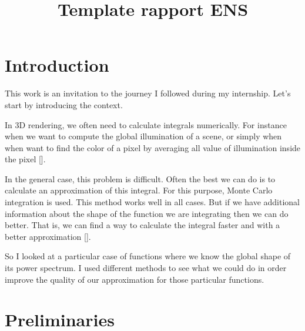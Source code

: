 \documentclass{classeENS}
\title{Template rapport ENS} %
\begin{document}

\matiere{} 
\motif{}


        
\fairemarges %
\tabledematieres %


\section{Introduction}

\> This work is an invitation to the journey I followed during my internship. 
Let's start by introducing the context.

\> In 3D rendering, we often need to calculate integrals numerically. 
For instance when we want to compute the global illumination of a scene,
or simply when when want to find the color of a pixel by averaging all
value of illumination inside the pixel [\cite{DBLP:journals/tog/RamamoorthiAMN12}]. 

\> In the general case, this problem is difficult. Often the best we 
can do is to calculate an approximation of this integral. For this 
purpose, Monte Carlo integration is used. This method works well in 
all cases. But if we have additional information about the shape of 
the function we are integrating then we can do better. That is, we can 
find a way to calculate the integral faster and with a better approximation 
[\cite{singh17convergence}].

\> So I looked at a particular case of functions where we know the global
shape of its power spectrum. I used different methods 
to see what we could do in order improve the quality of our approximation
for those particular functions. 

\section{Preliminaries}
\end{document}
